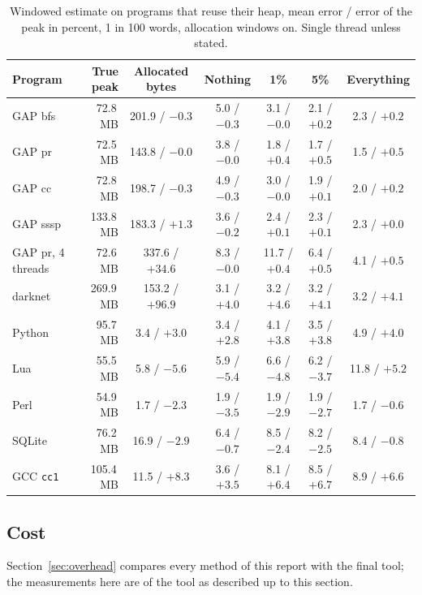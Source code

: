 \documentclass[11pt]{article}
\newcommand{\secref}[1]{Section~\ref{#1}}
\begin{document}
\begin{table}[t]
\centering
\small
\caption{Windowed estimate on programs that reuse their heap, mean error / error of the peak in percent, 1 in 100 words, allocation windows on. Single thread unless stated.}
\label{tab:real}
\begin{tabular}{lrccccc}
\toprule
Program & True peak & Allocated bytes & Nothing & 1\% & 5\% & Everything \\
\midrule
GAP bfs & 72.8\,MB & 201.9 / $-0.3$ & 5.0 / $-0.3$ & 3.1 / $-0.0$ & 2.1 / $+0.2$ & 2.3 / $+0.2$ \\
GAP pr & 72.5\,MB & 143.8 / $-0.0$ & 3.8 / $-0.0$ & 1.8 / $+0.4$ & 1.7 / $+0.5$ & 1.5 / $+0.5$ \\
GAP cc & 72.8\,MB & 198.7 / $-0.3$ & 4.9 / $-0.3$ & 3.0 / $-0.0$ & 1.9 / $+0.1$ & 2.0 / $+0.2$ \\
GAP sssp & 133.8\,MB & 183.3 / $+1.3$ & 3.6 / $-0.2$ & 2.4 / $+0.1$ & 2.3 / $+0.1$ & 2.3 / $+0.0$ \\
GAP pr, 4 threads & 72.6\,MB & 337.6 / $+34.6$ & 8.3 / $-0.0$ & 11.7 / $+0.4$ & 6.4 / $+0.5$ & 4.1 / $+0.5$ \\
darknet & 269.9\,MB & 153.2 / $+96.9$ & 3.1 / $+4.0$ & 3.2 / $+4.6$ & 3.2 / $+4.1$ & 3.2 / $+4.1$ \\
Python & 95.7\,MB & 3.4 / $+3.0$ & 3.4 / $+2.8$ & 4.1 / $+3.8$ & 3.5 / $+3.8$ & 4.9 / $+4.0$ \\
Lua & 55.5\,MB & 5.8 / $-5.6$ & 5.9 / $-5.4$ & 6.6 / $-4.8$ & 6.2 / $-3.7$ & 11.8 / $+5.2$ \\
Perl & 54.9\,MB & 1.7 / $-2.3$ & 1.9 / $-3.5$ & 1.9 / $-2.9$ & 1.9 / $-2.7$ & 1.7 / $-0.6$ \\
SQLite & 76.2\,MB & 16.9 / $-2.9$ & 6.4 / $-0.7$ & 8.5 / $-2.4$ & 8.2 / $-2.5$ & 8.4 / $-0.8$ \\
GCC \texttt{cc1} & 105.4\,MB & 11.5 / $+8.3$ & 3.6 / $+3.5$ & 8.1 / $+6.4$ & 8.5 / $+6.7$ & 8.9 / $+6.6$ \\
\bottomrule
\end{tabular}
\end{table}

\subsection{Cost}
\label{sec:cost}

\secref{sec:overhead} compares every method of this report with the final tool; the measurements here are of the tool as described up to this section.
\end{document}
